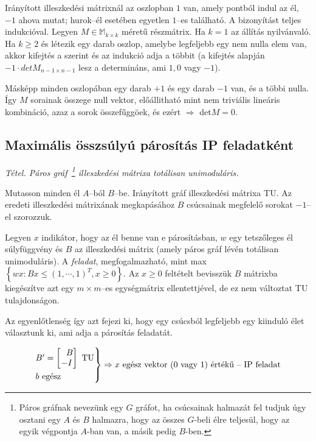 Irányított illeszkedési mátrixnál az oszlopban $1$ van, amely pontból indul az
él, $-1$ ahova mutat; hurok--él esetében egyetlen $1$--es található. A
bizonyítást teljes indukcióval. Legyen $M \in \mathbb{M}_{k\times k}$ méretű
részmátrix. Ha $k=1$ az állítás nyilvánvaló. Ha $k \geq 2$ és létezik egy darab
oszlop, amelybe legfeljebb egy nem nulla elem van, akkor kifejtés a szerint és
az indukció adja a többit (a kifejtés alapján $-1\cdot detM_{n-1\times n-1}$
lesz a determináns, ami $1,0$ vagy $-1$).

Másképp minden oszlopában egy darab $+1$ és egy darab $-1$ van, és a többi
nulla. Így $M$ sorainak összege null vektor, előállitható mint nem triviális
lineáris kombináció, azaz a sorok összefűggöek, és ezért $\Rightarrow$ det$M=0$.

\subsection{Maximális összsúlyú párosítás IP feladatként}

\emph{Tétel. Páros gráf~\footnote{Páros gráfnak nevezünk egy $G$ gráfot, ha
csúcsainak halmazát fel tudjuk úgy osztani egy $A$ és $B$ halmazra, hogy az
összes $G$-beli élre teljesül, hogy az egyik végpontja $A$-ban van, a másik
pedig $B$-ben.} illeszkedési mátrixa totálisan unimoduláris.}
\vspace{0.4cm}

Mutasson minden él $A$--ból $B$--be. Irányított gráf illeszkedési mátrixa TU. Az
eredeti illeszkedési mátrixának megkapásához $B$ csúcsainak megfelelő sorokat
$-1$--el szorozzuk.

Legyen $x$ indikátor, hogy az él benne van e párosításban, $w$ egy tetszőleges
él súlyfüggvény és $B$ az illeszkedési mátrix (amely páros gráf lévén totálisan
unimoduláris). A \emph{feladat}, megfogalmazható, mint max$\left\{ wx:Bx \leq (1,
\cdots, 1)^T, x \geq 0 \right\}$. Az $x \geq 0 $ feltételt bevisszük $B$
mátrixba kiegészítve azt egy $m \times m$--es egységmátrix ellentettjével, de ez
nem változtat TU tulajdonságon.

Az egyenlőtlenség így azt fejezi ki, hogy egy csúcsból legfeljebb egy kiinduló
élet választunk ki, ami adja a párosítás feladatát.

\[
\begin{rcases}
B'=\begin{bmatrix} ~~B \\ -I \end{bmatrix} \text{ TU} \\
b \text{ egész}
\end{rcases} \Rightarrow x \text{ egész vektor ($0$ vagy $1$) értékű -- IP feladat}
\]

